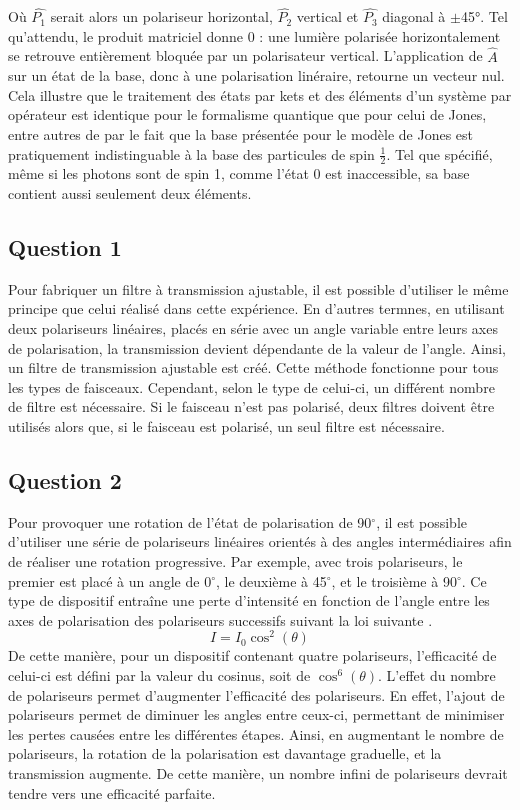 \documentclass[11pt,letterpaper]{article}
\begin{document}
Où $\hat{P_1}$ serait alors un polariseur horizontal, $\hat{P_2}$ vertical et $\hat{P_3}$ diagonal à $\pm$45°. Tel qu'attendu, le produit matriciel donne 0 : une
lumière polarisée horizontalement se retrouve entièrement bloquée par un polarisateur vertical. L'application de $\hat{A}$ sur un état de la base, donc à une polarisation linéraire, retourne un vecteur nul. Cela illustre que le traitement
des états par kets et des éléments d'un système par opérateur est identique pour le formalisme quantique que pour celui de Jones, entre autres de par le fait que la base présentée pour le modèle de Jones est pratiquement indistinguable à la base des particules de spin $\frac{1}{2}$. Tel que spécifié, même si les photons sont de spin 1, comme l'état 0 est inaccessible, sa base contient aussi seulement deux éléments.

\subsection{Question 1}
Pour fabriquer un filtre à transmission ajustable, il est possible d'utiliser le même principe que celui réalisé dans cette expérience. En d'autres termnes, en utilisant deux polariseurs linéaires, placés en série avec un angle variable entre leurs axes de polarisation, la transmission devient dépendante de la valeur de l'angle. Ainsi, un filtre de transmission ajustable est créé. Cette méthode fonctionne pour tous les types de faisceaux. Cependant, selon le type de celui-ci, un différent nombre de filtre est nécessaire. Si le faisceau n'est pas polarisé, deux filtres doivent être utilisés alors que, si le faisceau est polarisé, un seul filtre est nécessaire.

\subsection{Question 2}
Pour provoquer une rotation de l'état de polarisation de 90$^\circ$, il est possible d'utiliser une série de polariseurs linéaires orientés à des angles intermédiaires afin de réaliser une rotation progressive. Par exemple, avec trois polariseurs, le premier est placé à un angle de 0$^\circ$, le deuxième à 45$^\circ$, et le troisième à 90$^\circ$. Ce type de dispositif entraîne une perte d'intensité en fonction de l'angle entre les axes de polarisation des polariseurs successifs suivant la loi suivante \cite{sheehy_experience_2024}.
\begin{equation}
  I=I_{0}\cos^{2}(\theta)
\end{equation}
De cette manière, pour un dispositif contenant quatre polariseurs, l'efficacité de celui-ci est défini par la valeur du cosinus, soit de $\cos^{6}(\theta)$. L'effet du nombre de polariseurs permet d'augmenter l'efficacité des polariseurs. En effet, l'ajout de polariseurs permet de diminuer les angles entre ceux-ci, permettant de minimiser les pertes causées entre les différentes étapes. Ainsi, en augmentant le nombre de polariseurs, la rotation de la polarisation est davantage graduelle, et la transmission augmente. De cette manière, un nombre infini de polariseurs devrait tendre vers une efficacité parfaite.
\end{document}
